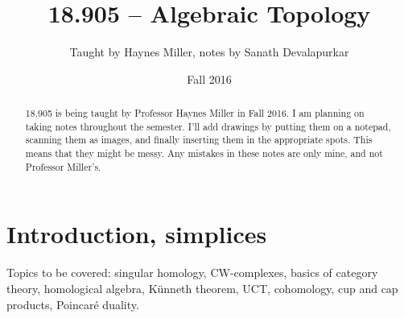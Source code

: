 \documentclass{amsart}
\theoremstyle{theorem}
\theoremstyle{definition}
\begin{document}
\title{18.905 -- Algebraic Topology}
\author{Taught by Haynes Miller, notes by Sanath Devalapurkar}
\date{Fall 2016}
\maketitle
\begin{abstract}
18.905 is being taught by Professor Haynes Miller in Fall 2016. I am planning on taking notes throughout the semester. I'll add drawings by putting them on a notepad, scanning them as images, and finally inserting them in the appropriate spots. This means that they might be messy. Any mistakes in these notes are only mine, and not Professor Miller's.
\end{abstract}
\tableofcontents
\newpage
\section{Introduction, simplices}
Topics to be covered: singular homology, CW-complexes, basics of category theory, homological algebra, K\"{u}nneth theorem, UCT, cohomology, cup and cap products, Poincar\'{e} duality.
\end{document}
